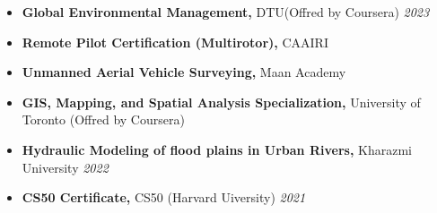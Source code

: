\documentclass[letterpaper,11pt]{article}
\begin{document}
	\vspace{-1.2em}
	\begin{itemize}[left=0pt, label={}, topsep=7.5pt, partopsep=0pt, itemsep=6pt, parsep=0pt]
		\item \textbf{Global Environmental Management,} DTU\footnotemark[2] (Offred by Coursera)  \hfill \textit{2023}
	\end{itemize}
	\vspace{-1.2em}
	\begin{itemize}[left=0pt, label={}, topsep=7.5pt, partopsep=0pt, itemsep=6pt, parsep=0pt]
		\item \textbf{Remote Pilot Certification (Multirotor),} CAAIRI\footnotemark[3] \hfill \textit{}
	\end{itemize}
	\vspace{-1.2em}
	\begin{itemize}[left=0pt, label={}, topsep=7.5pt, partopsep=0pt, itemsep=6pt, parsep=0pt]
		\item \textbf{Unmanned Aerial Vehicle Surveying,} Maan Academy  \hfill \textit{}
	\end{itemize}
	\vspace{-1.2em}
	\begin{itemize}[left=0pt, label={}, topsep=7.5pt, partopsep=0pt, itemsep=6pt, parsep=0pt]
		\item \textbf{GIS, Mapping, and Spatial Analysis Specialization,} University of Toronto (Offred by Coursera) \hfill \textit{}
	\end{itemize}
	\vspace{-1.2em}
	\begin{itemize}[left=0pt, label={}, topsep=7.5pt, partopsep=0pt, itemsep=6pt, parsep=0pt]
		\item \textbf{Hydraulic Modeling of flood plains in Urban Rivers,}  Kharazmi University \hfill \textit{2022}
	\end{itemize}
	\vspace{-1.2em}
	\begin{itemize}[left=0pt, label={}, topsep=7.5pt, partopsep=0pt, itemsep=6pt, parsep=0pt]
		\item \textbf{CS50 Certificate,}  CS50 (Harvard Uiversity) \hfill \textit{2021}
	\end{itemize}
	\vspace{-1.2em}
	\vspace{-0.6em} 
\end{document}
